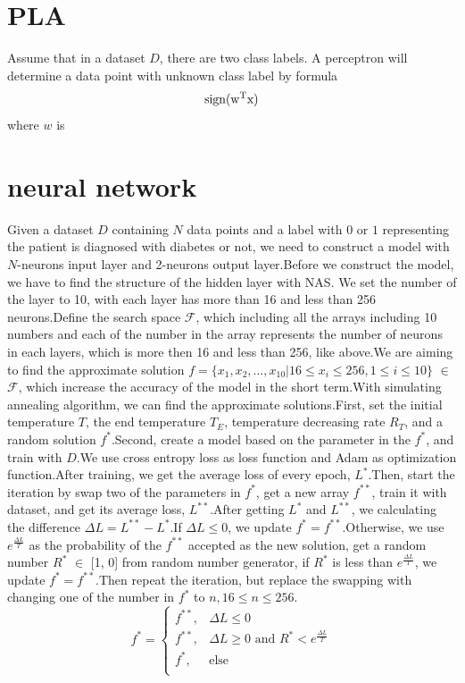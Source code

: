 \documentclass[twocolumn,10pt]{article}
\begin{document}
\section{PLA}
  Assume that in a dataset $D$, there are two class labels. A perceptron will determine a data point with unknown class label by formula 
  \begin{equation}
    \rm{sign}(w^Tx)
  \end{equation}
  where $w$ is 

\section{neural network}
  Given a dataset $D$ containing $N$ data points and a label with $0$ or $1$ representing the patient is diagnosed with diabetes or 
  not, we need to construct a model with $N$-neurons input layer and 2-neurons output layer.Before we construct the model, we have 
  to find the structure of the hidden layer with NAS.
  We set the number of the layer to 10, with each layer has more than 16 and less than 256 neurons.Define the search space $\mathcal{F}$, 
  which including all the arrays including 10 numbers and each of the number in the array represents the number of neurons in each layers, 
  which is more then 16 and less than 256, like above.We are aiming to find the approximate solution 
  $f= \{x_1, x_2, ..., x_{10}|16\leq x_i \leq 256, 1\leq i \leq 10\}$ $\in$ $\mathcal{F}$, which increase the accuracy of the model in 
  the short term.With simulating annealing algorithm\cite{17235}, we can find the approximate solutions.First, set the initial temperature 
  $T$, the end temperature $T_E$, temperature decreasing rate $R_T$, and a random solution $f^*$.Second, create a model based on the 
  parameter in the $f^*$, and train with $D$.We use cross entropy loss as loss function and Adam as optimization function.After training, 
  we get the average loss of every epoch, $L^*$.Then, start the iteration by swap two of the parameters in $f^*$, get a new array $f^{**}$, 
  train it with dataset, and get its average loss, $L^{**}$.After getting $L^*$ and $L^{**}$, we calculating the difference 
  $\Delta L = L^{**} - L^*$.If $\Delta L \leq 0$, we update $f^* = f^{**}$.Otherwise, we use $e^{\frac{\Delta L}{T}}$ as the probability 
  of the $f^{**}$ accepted as the new solution, get a random number $R^*$ $\in$ [1, 0] from random number generator, if $R^*$ is less than 
  $e^{\frac{\Delta L}{T}}$, we update $f^* = f^{**}$.Then repeat the iteration, but replace the swapping with changing one of the number 
  in $f^*$ to $n, 16 \leq n \leq 256$.
  \begin{equation}
	  f^* = 
	  \begin{cases}
	  f^{**},  &\Delta L\le 0 \\
	  f^{**},  &\Delta L \ge 0 \text{ and } R^*<e^{\frac{\Delta L}{T}} \\ 
	  f^{*},   &\text{else}\\
	  \end{cases}
  \end{equation} 
\end{document}
